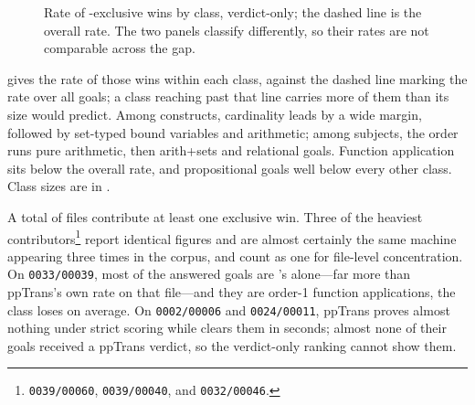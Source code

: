 \begin{figure}[!htbp]
\centering
{}
\caption{Rate of \beer{}-exclusive wins by class, verdict-only; the dashed
  line is the overall rate. The two panels classify differently, so their
  rates are not comparable across the gap.}
\label{fig:eval-bo}
\end{figure}

 gives the rate of those wins within each class, against the dashed line marking the rate over all goals; a class reaching past that line carries more of them than its size would predict.
Among constructs, cardinality leads by a wide margin, followed by set-typed bound variables and arithmetic; among subjects, the order runs pure arithmetic, then arith+sets and relational goals.
Function application sits below the overall rate, and propositional goals well below every other class.
Class sizes are in .

A total of \bmBOFiles{} files contribute at least one exclusive win.
Three of the heaviest contributors\footnote{\texttt{0039/00060}, \texttt{0039/00040}, and \texttt{0032/00046}.} report identical figures and are almost certainly the same machine appearing three times in the corpus, and count as one for file-level concentration.
On \texttt{0033/00039}, most of the answered goals are \beer{}'s alone---far more than ppTrans's own rate on that file---and they are order-1 function applications, the class \beer{} loses on average.
On \texttt{0002/00006} and \texttt{0024/00011}, ppTrans proves almost nothing under strict scoring while \beer{} clears them in seconds; almost none of their goals received a ppTrans verdict, so the verdict-only ranking cannot show them.

